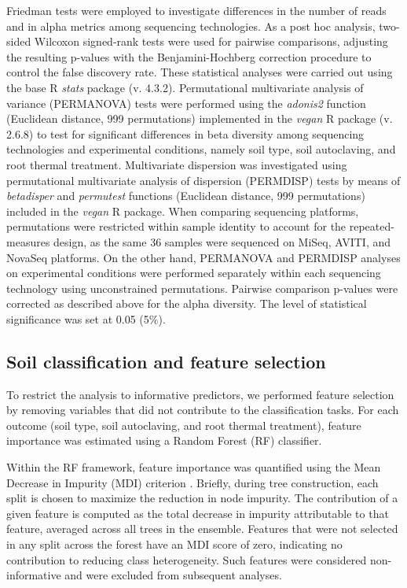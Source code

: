 \documentclass[12pt]{article}
\theoremstyle{thmstyleone}%
\theoremstyle{thmstyletwo}%
\theoremstyle{thmstylethree}%
\begin{document}
Friedman tests were employed to investigate differences in the number of reads and in alpha metrics among sequencing technologies. As a post hoc analysis, two-sided Wilcoxon signed-rank tests were used for pairwise comparisons, adjusting the resulting p-values with the Benjamini-Hochberg correction procedure to control the false discovery rate. These statistical analyses were carried out using the base R \textit{stats} package (v. 4.3.2). Permutational multivariate analysis of variance (PERMANOVA) tests were performed using the \textit{adonis2} function (Euclidean distance, 999 permutations) implemented in the \textit{vegan} R package (v. 2.6.8) \citep{vegan} to test for significant differences in beta diversity among sequencing technologies and experimental conditions, namely soil type, soil autoclaving, and root thermal treatment. Multivariate dispersion was investigated using permutational multivariate analysis of dispersion (PERMDISP) tests by means of \textit{betadisper} and \textit{permutest} functions (Euclidean distance, 999 permutations) included in the \textit{vegan} R package. When comparing sequencing platforms, permutations were restricted within sample identity to account for the repeated-measures design, as the same 36 samples were sequenced on MiSeq, AVITI, and NovaSeq platforms. On the other hand, PERMANOVA and PERMDISP analyses on experimental conditions were performed separately within each sequencing technology using unconstrained permutations. Pairwise comparison p-values were corrected as described above for the alpha diversity. The level of statistical significance was set at 0.05 (5\%).

\subsection{Soil classification and feature selection}
\label{soil_and_feature}
To restrict the analysis to informative predictors, we performed feature selection by removing variables that did not contribute to the classification tasks. For each outcome (soil type, soil autoclaving, and root thermal treatment), feature importance was estimated using a Random Forest (RF) classifier.

Within the RF framework, feature importance was quantified using the Mean Decrease in Impurity (MDI) criterion \citep{louppe2013understanding}. Briefly, during tree construction, each split is chosen to maximize the reduction in node impurity. The contribution of a given feature is computed as the total decrease in impurity attributable to that feature, averaged across all trees in the ensemble. Features that were not selected in any split across the forest have an MDI score of zero, indicating no contribution to reducing class heterogeneity. Such features were considered non-informative and were excluded from subsequent analyses.
\end{document}
